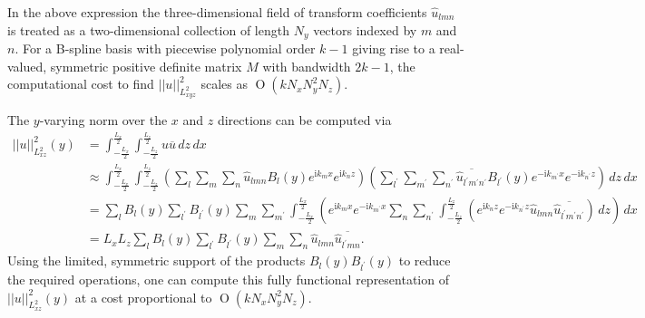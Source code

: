 \documentclass[letterpaper,11pt,nointlimits,reqno]{amsart}
\newcommand{\ii}{\ensuremath{\mathrm{i}}}
\newcommand{\OO}[1]{\operatorname{O}\left(#1\right)}
\begin{document}
In the above expression the three-dimensional field of transform coefficients
$\hat{u}_{l m n}$ is treated as a two-dimensional collection of length $N_y$
vectors indexed by $m$ and $n$.  For a B-spline basis with piecewise polynomial
order $k - 1$ giving rise to a real-valued, symmetric positive definite matrix
$M$ with bandwidth $2k-1$, the computational cost to find $\left|\left| u
\right|\right|^{2}_{L^{2}_{xyz}}$ scales as $\OO{k N_x N_y^2 N_z}$.

The $y$-varying norm over the $x$ and $z$ directions can be computed via
\begin{align}
  \left|\left|
    u
  \right|\right|^{2}_{L^{2}_{xz}}
  \!(y)
&=
  \int_{-\frac{L_x}{2}}^{\frac{L_x}{2}}
  \int_{-\frac{L_z}{2}}^{\frac{L_z}{2}}
  u
  \overline{u}
  \,d\!z \,d\!x
\\ &\approx
  \int_{-\frac{L_x}{2}}^{\frac{L_x}{2}}
  \int_{-\frac{L_z}{2}}^{\frac{L_z}{2}}
  \left(
    \sum_{l}\sum_{m}\sum_{n}
    \hat{u}_{l m n}B_l\!\left(y\right)e^{\ii k_m x}e^{\ii k_n z}
  \right)
  \left(
    \sum_{l^\prime}\sum_{m^\prime}\sum_{n^\prime}
    \overline{\hat{u}_{l^\prime m^\prime n^\prime}}
    B_{l^\prime}\!\left(y\right)e^{-\ii k_{m^\prime} x}e^{-\ii k_{n^\prime} z}
  \right)
  \,d\!z \,d\!x
\\ &=
  \sum_{l}
  B_l\!\left(y\right)
  \sum_{l^\prime}
  B_{l^\prime}\!\left(y\right)
  \sum_{m}
  \sum_{m^\prime}
  \int_{-\frac{L_x}{2}}^{\frac{L_x}{2}}
  \left(
    e^{\ii k_m x}
    e^{-\ii k_{m^\prime} x}
    \sum_{n}
    \sum_{n^\prime}
    \int_{-\frac{L_z}{2}}^{\frac{L_z}{2}}
    \left(
      e^{\ii k_n z}
      e^{-\ii k_{n^\prime} z}
      \hat{u}_{l m n}
      \overline{\hat{u}_{l^\prime m^\prime n^\prime}}
    \right)
    \,d\!z
  \right)
  \,d\!x
\\ &=
  L_x L_z
  \sum_{l}
  B_l\!\left(y\right)
  \sum_{l^\prime}
  B_{l^\prime}\!\left(y\right)
  \sum_{m} \sum_{n} \hat{u}_{l m n} \overline{\hat{u}_{l^\prime m n}}
  .
\end{align}
Using the limited, symmetric support of the products $B_l\left(y\right)
B_{l^\prime}\left(y\right)$ to reduce the required operations, one can compute
this fully functional representation of $\left|\left| u
\right|\right|^{2}_{L^{2}_{xz}} \!(y)$ at a cost proportional to $\OO{k N_x
N_y^2 N_z}$.
\end{document}
